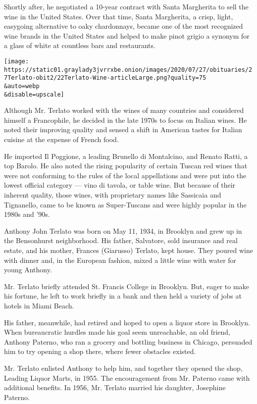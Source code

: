 Shortly after, he negotiated a 10-year contract with Santa Margherita to
sell the wine in the United States. Over that time, Santa Margherita, a
crisp, light, easygoing alternative to oaky chardonnays, became one of
the most recognized wine brands in the United States and helped to make
pinot grigio a synonym for a glass of white at countless bars and
restaurants.

\texttt{[image: https://static01.graylady3jvrrxbe.onion/images/2020/07/27/obituaries/27Terlato-obit2/22Terlato-Wine-articleLarge.png?quality=75\\\&auto=webp\\\&disable=upscale]}

Although Mr. Terlato worked with the wines of many countries and
considered himself a Francophile, he decided in the late 1970s to focus
on Italian wines. He noted their improving quality and sensed a shift in
American tastes for Italian cuisine at the expense of French food.

He imported Il Poggione, a leading Brunello di Montalcino, and Renato
Ratti, a top Barolo. He also noted the rising popularity of certain
Tuscan red wines that were not conforming to the rules of the local
appellations and were put into the lowest official category --- vino di
tavola, or table wine. But because of their inherent quality, those
wines, with proprietary names like Sassicaia and Tignanello, came to be
known as Super-Tuscans and were highly popular in the 1980s and '90s.

Anthony John Terlato was born on May 11, 1934, in Brooklyn and grew up
in the Bensonhurst neighborhood. His father, Salvatore, sold insurance
and real estate, and his mother, Frances (Giarusso) Terlato, kept house.
They poured wine with dinner and, in the European fashion, mixed a
little wine with water for young Anthony.

Mr. Terlato briefly attended St. Francis College in Brooklyn. But, eager
to make his fortune, he left to work briefly in a bank and then held a
variety of jobs at hotels in Miami Beach.

His father, meanwhile, had retired and hoped to open a liquor store in
Brooklyn. When bureaucratic hurdles made his goal seem unreachable, an
old friend, Anthony Paterno, who ran a grocery and bottling business in
Chicago, persuaded him to try opening a shop there, where fewer
obstacles existed.

Mr. Terlato enlisted Anthony to help him, and together they opened the
shop, Leading Liquor Marts, in 1955. The encouragement from Mr. Paterno
came with additional benefits. In 1956, Mr. Terlato married his
daughter, Josephine Paterno.

